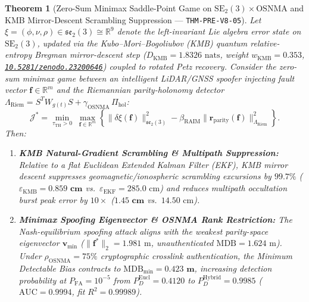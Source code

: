 \documentclass[11pt,a4paper,reqno]{article}
\newcommand{\zenodo}[1]{\href{https://doi.org/10.5281/zenodo.#1}{\nolinkurl{10.5281/zenodo.#1}}}
\theoremstyle{plain}
\newtheorem{theorem}{Theorem}[section]
\theoremstyle{definition}
\theoremstyle{remark}
\numberwithin{equation}{section}
\begin{document}
\begin{theorem}[{Zero-Sum Minimax Saddle-Point Game on $\mathrm{SE}_2(3) \times \mathrm{OSNMA}$ and KMB Mirror-Descent Scrambling Suppression --- \texttt{THM-PRE-V8-05}}]\label{thm:adversarial_raim_game}
Let $\xi = (\phi, \nu, \rho) \in \mathfrak{se}_2(3) \cong \mathbb{R}^9$ denote the left-invariant Lie algebra error state on $\mathrm{SE}_2(3)$, updated via the Kubo--Mori--Bogoliubov (KMB) quantum relative-entropy Bregman mirror-descent step ($D_{\mathrm{KMB}} = 1.8326\text{ nats}$, weight $w_{\mathrm{KMB}} = 0.353$, \zenodo{23200646}) coupled to rotated Petz recovery. Consider the zero-sum minimax game between an intelligent LiDAR/GNSS spoofer injecting fault vector $\mathbf{f} \in \mathbb{R}^m$ and the Riemannian parity-holonomy detector $\Lambda_{\mathrm{Riem}} = S^T W_{g(t)} S + \gamma_{\mathrm{OSNMA}}\,\Pi_{\mathrm{hol}}$:
\begin{equation}\label{eq:minimax_game}
  \mathcal{J}^* = \min_{\tau_{\mathrm{TH}} > 0} \;\max_{\mathbf{f} \in \mathbb{R}^m} \left\{ \|\delta\xi(\mathbf{f})\|_{\mathfrak{se}_2(3)}^2 - \beta_{\mathrm{RAIM}} \|\mathbf{r}_{\mathrm{parity}}(\mathbf{f})\|_{\Lambda_{\mathrm{Riem}}}^2 \right\}.
\end{equation}
Then:
\begin{enumerate}[label=\textbf{(\arabic*)}, leftmargin=2.0em]
  \item \textbf{KMB Natural-Gradient Scrambling \& Multipath Suppression:} Relative to a flat Euclidean Extended Kalman Filter (EKF), KMB mirror descent suppresses geomagnetic/ionospheric scrambling excursions by $\bm{99.7\%}$ ($\varepsilon_{\mathrm{KMB}} = \bm{0.859\text{ cm}}$ vs.\ $\varepsilon_{\mathrm{EKF}} = 285.0\text{ cm}$) and reduces multipath occultation burst peak error by $10\times$ ($\bm{1.45\text{ cm}}$ vs.\ $14.50\text{ cm}$).
  \item \textbf{Minimax Spoofing Eigenvector \& OSNMA Rank Restriction:} The Nash-equilibrium spoofing attack aligns with the weakest parity-space eigenvector $\mathbf{v}_{\min}$ ($\|\mathbf{f}^*\|_2 = 1.981\text{ m}$, unauthenticated $\mathrm{MDB} = 1.624\text{ m}$). Under $\rho_{\mathrm{OSNMA}} = 75\%$ cryptographic crosslink authentication, the Minimum Detectable Bias contracts to $\mathrm{MDB}_{\min} = \bm{0.423\text{ m}}$, increasing detection probability at $P_{\mathrm{FA}} = 10^{-5}$ from $P_D^{\mathrm{Eucl}} = 0.4120$ to $P_D^{\mathrm{Hybrid}} = \bm{0.9985}$ ($\mathrm{AUC} = \bm{0.9994}$, fit $R^2 = 0.99989$).
\end{enumerate}
\end{theorem}
\end{document}
